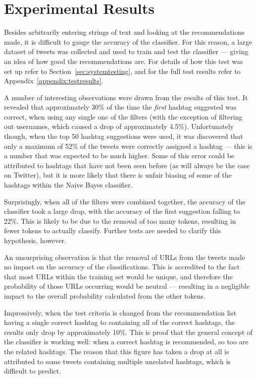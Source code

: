 \documentclass[11pt,a4paper]{report}
\begin{document}
\section{Experimental Results}
\label{sec:experimenteval}
Besides arbitrarily entering strings of text and looking at the recommendations made, it is difficult to gauge the accuracy of the classifier. For this reason, a large dataset of tweets was collected and used to train and test the classifier --- giving an idea of how good the recommendations are. For details of how this test was set up refer to Section~\ref{sec:systemtesting}, and for the full test results refer to Appendix~\ref{appendix:testresults}.

A number of interesting observations were drawn from the results of this test. It revealed that approximately 30\% of the time the \emph{first} hashtag suggested was correct, when using any single one of the filters (with the exception of filtering out usernames, which caused a drop of approximately 4.5\%). Unfortunately though, when the top 50 hashtag suggestions were used, it was discovered that only a maximum of 52\% of the tweets were correctly assigned a hashtag --- this is a number that was expected to be much higher. Some of this error could be attributed to hashtags that have not been seen before (as will always be the case on Twitter), but it is more likely that there is unfair biasing of some of the hashtags within the Naive Bayes classifier.

Surprisingly, when all of the filters were combined together, the accuracy of the classifier took a large drop, with the accuracy of the first suggestion falling to 22\%. This is likely to be due to the removal of too many tokens, resulting in fewer tokens to actually classify. Further tests are needed to clarify this hypothesis, however.

An unsurprising observation is that the removal of URLs from the tweets made no impact on the accuracy of the classifications. This is accredited to the fact that most URLs within the training set would be unique, and therefore the probability of those URLs occurring would be neutral --- resulting in a negligible impact to the overall probability calculated from the other tokens.

Impressively, when the test criteria is changed from the recommendation list having a single correct hashtag to containing all of the correct hashtags, the results only drop by approximately 10\%. This is proof that the general concept of the classifier is working well: when a correct hashtag is recommended, so too are the related hashtags. The reason that this figure has taken a drop at all is attributed to some tweets containing multiple unrelated hashtags, which is difficult to predict.
\end{document}

